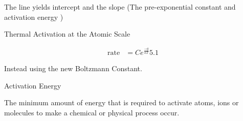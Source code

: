 \documentclass{article}
\begin{document}
The line yields intercept and the slope (The pre-exponential constant and activation energy )


\Large
Thermal Activation at the Atomic Scale

\normalsize

\begin{equation}
\begin{split}
\text{rate} &= C e^{\frac{-q}{kT}} 5.1
\end{split}
\end{equation}

Instead using the new Boltzmann Constant.

\Large
Activation Energy

\normalsize
The minimum amount of energy that is required to activate atoms, ions or molecules to make a chemical or physical process occur.
\end{document}
